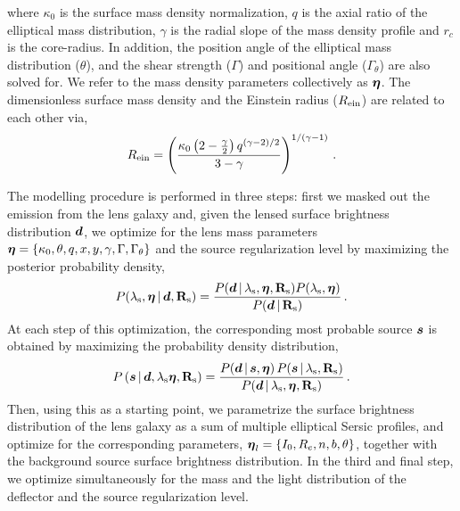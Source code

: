 \documentclass[a4paper,fleqn,usenatbib]{mnras}
\begin{document}
%
where $\kappa_0$ is the surface mass density normalization, $q$ is the axial ratio of the elliptical mass distribution, $\gamma$ is the radial slope of the mass density profile and $r_c$ is the core-radius. In addition, the position angle of the elliptical mass distribution ($\theta$), and the shear strength ($\Gamma$) and positional angle ($\Gamma_\theta$) are also solved for. We refer to the mass density parameters collectively as $\bmath{\eta}$. The dimensionless surface mass density and the Einstein radius ($R_{\rm{ein}}$) are related to each other via,
%
\begin{equation}\label{einsteinradius}
R_{\rm{ein}} = \left ( \frac{\kappa_0 \left ( 2 - \frac{\gamma}{2} \right ) q^{\left ( \gamma - 2 \right )/2}}{3 - \gamma} \right )^{1/\left ( \gamma - 1 \right )}\,.
\end{equation}
%

The modelling procedure is performed in three steps: first we masked out the emission from the lens galaxy and, given the lensed surface brightness distribution $\bmath d$, we optimize for the lens mass parameters $\bmath \eta = \{\kappa_0,\theta,q,x,y,\gamma,\Gamma,\Gamma_{\theta}\}$ and the source regularization level by maximizing the posterior probability density, 
\begin{equation}\label{equ:posterior}
    P(\lambda_{\rm{s}},\bmath \eta\,|\,\bmath d,\mathbf
      R_{\rm{s}})=\frac{P(\bmath d\,|\,\lambda_{\rm{s}},\bmath \eta,\mathbf
      R_{\rm{s}})P(\lambda_{\rm{s}},\bmath \eta)}{P(\bmath d\,|\,\mathbf
      R_{\rm{s}})}\,.
\end{equation}
At each step of this optimization, the corresponding most probable source $\bmath s$ is obtained by maximizing the probability density distribution,
\begin{equation}
    P\left(\bmath s\,|\,\bmath d,\lambda_{\rm{s}}\bmath \eta,\mathbf R_{\rm{s}}\right)=\frac{P(\bmath d \,|\,\bmath s,\bmath \eta)\, P(\bmath s\,|\,\lambda_{\rm{s}},\mathbf R_{\rm{s}})}{P(\bmath     d \,|\,\lambda_{\rm{s}},\bmath \eta,\mathbf R_{\rm{s}})}\,.
   \label{eq:evidence} 
 \end{equation}
Then, using this as a starting point, we parametrize the surface brightness distribution of the lens galaxy as a sum of multiple elliptical Sersic profiles, and optimize for the corresponding parameters, $\bmath \eta_l =\{I_0, R_e, n, b, \theta\}$, together with the background source surface brightness distribution. In the third and final step, we optimize simultaneously for the mass and the light distribution of the deflector and the source regularization level.
\end{document}
